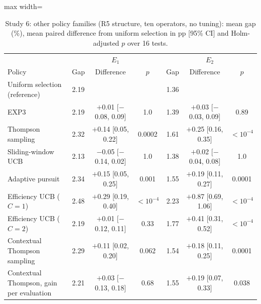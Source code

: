 \begin{table}[t]
\caption{Study 6: other policy families (R5 structure, ten operators, no tuning): mean gap (\%), mean paired difference from uniform selection in pp [95\% CI] and Holm-adjusted $p$ over 16 tests.}\label{tab:s6}
\centering
\small
\begin{adjustbox}{max width=\linewidth}
\begin{tabular}{lcccccc}
\toprule
 & \multicolumn{3}{c}{$E_1$} & \multicolumn{3}{c}{$E_2$} \\ Policy & Gap & Difference & $p$ & Gap & Difference & $p$ \\
\midrule
Uniform selection (reference) & 2.19 & & & 1.36 & &  \\
EXP3 & 2.19 & $+$0.01 [$-$0.08, 0.09] & 1.0 & 1.39 & $+$0.03 [$-$0.03, 0.09] & 0.89 \\
Thompson sampling & 2.32 & $+$0.14 [0.05, 0.22] & 0.0002 & 1.61 & $+$0.25 [0.16, 0.35] & \ensuremath{<10^{-4}} \\
Sliding-window UCB & 2.13 & $-$0.05 [$-$0.14, 0.02] & 1.0 & 1.38 & $+$0.02 [$-$0.04, 0.08] & 1.0 \\
Adaptive pursuit & 2.34 & $+$0.15 [0.05, 0.25] & 0.001 & 1.55 & $+$0.19 [0.11, 0.27] & 0.0001 \\
Efficiency UCB ($C=1$) & 2.48 & $+$0.29 [0.19, 0.40] & \ensuremath{<10^{-4}} & 2.23 & $+$0.87 [0.69, 1.06] & \ensuremath{<10^{-4}} \\
Efficiency UCB ($C=2$) & 2.19 & $+$0.01 [$-$0.12, 0.11] & 0.33 & 1.77 & $+$0.41 [0.31, 0.52] & \ensuremath{<10^{-4}} \\
Contextual Thompson sampling & 2.29 & $+$0.11 [0.02, 0.20] & 0.062 & 1.54 & $+$0.18 [0.11, 0.25] & 0.0001 \\
Contextual Thompson, gain per evaluation & 2.21 & $+$0.03 [$-$0.13, 0.18] & 0.68 & 1.55 & $+$0.19 [0.07, 0.33] & 0.038 \\
\bottomrule
\end{tabular}
\end{adjustbox}
\end{table}
